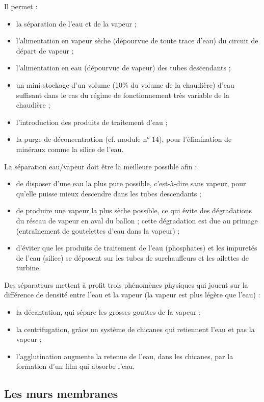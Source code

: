 Il permet :
\begin{itemize}
\item la séparation de l’eau et de la vapeur ;
\item l’alimentation en vapeur sèche (dépourvue de toute trace d’eau) du circuit de départ de vapeur ;
\item l’alimentation en eau (dépourvue de vapeur) des tubes descendants ;
\item un mini-stockage d’un volume (10\% du volume de la chaudière) d’eau suffisant dans le cas du régime de fonctionnement très variable de la chaudière ;
\item l’introduction des produits de traitement d’eau ;
\item la purge de déconcentration (cf. module n° 14), pour l’élimination de minéraux comme la silice de l’eau.
\end{itemize}

La séparation eau/vapeur doit être la meilleure possible afin :
\begin{itemize}
\item de disposer d’une eau la plus pure possible, c’est-à-dire sans vapeur, pour qu’elle puisse mieux descendre dans les tubes descendants ;
\item de produire une vapeur la plus sèche possible, ce qui évite des dégradations du réseau de vapeur en aval du ballon ; cette dégradation est due au primage (entraînement de goutelettes d’eau dans la vapeur) ;
\item  d’éviter que les produits de traitement de l’eau (phosphates) et les impuretés de l’eau (silice) se déposent sur les tubes de surchauffeurs et les ailettes de turbine.
\end{itemize} 

Des séparateurs mettent à profit trois phénomènes physiques qui jouent sur la différence de densité entre l’eau et la vapeur (la vapeur est plus légère que l’eau) :
\begin{itemize}
\item  la décantation, qui sépare les grosses gouttes de la vapeur ;
\item la centrifugation, grâce un système de chicanes qui retiennent l’eau et pas la vapeur ;
\item  l’agglutination augmente la retenue de l’eau, dans les chicanes, par la formation d’un film qui absorbe l’eau.

\end{itemize}

\subsection{Les murs membranes} 

